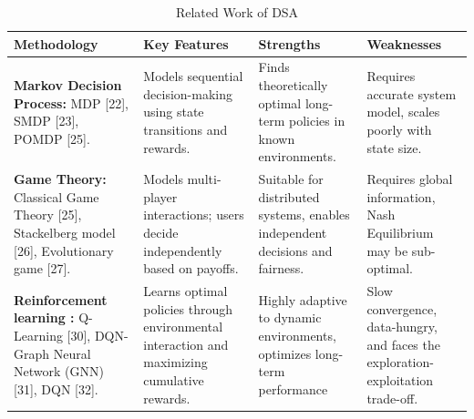 \documentclass[journal]{IEEEtran}
\begin{document}
\begin{table}[t!] 
\centering
\caption{Related Work of DSA}
\label{tab:related_work}
\begin{tabularx}{\textwidth}{| >{\raggedright}p{4.5cm} | *{3}{>{\raggedright\arraybackslash}X |}}
\hline 
\textbf{Methodology} & \textbf{Key Features} & \textbf{Strengths} & \textbf{Weaknesses} \\
\hline 
\textbf{Markov Decision Process:} MDP [22], SMDP [23], POMDP [25].
& Models sequential decision-making using state transitions and rewards.
& Finds theoretically optimal long-term policies in known environments.
& Requires accurate system model, scales poorly with state size.\\
\hline 
\textbf{Game Theory:} Classical Game Theory [25], Stackelberg model [26], Evolutionary game [27].
& Models multi-player interactions; users decide independently based on payoffs.
& Suitable for distributed systems, enables independent decisions and fairness.
&Requires global information, Nash Equilibrium may be sub-optimal.\\
\hline 
\textbf{Reinforcement learning :} Q-Learning [30], DQN-Graph Neural Network (GNN) [31], DQN [32].
& Learns optimal policies through environmental interaction and maximizing cumulative rewards.
& Highly adaptive to dynamic environments, optimizes long-term performance
&Slow convergence, data-hungry, and faces the exploration-exploitation trade-off. \\
\hline 
\end{tabularx}
\end{table}
\end{document}
